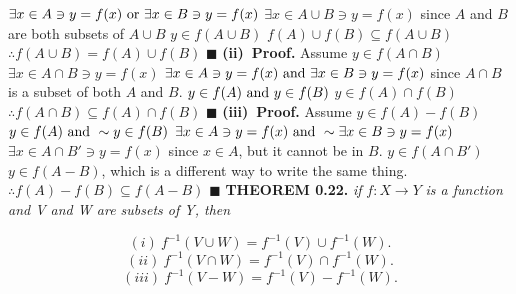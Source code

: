 \documentclass[12pt]{article}
\begin{document}
	\newline
	\(\exists x \in A \ni y = f(x)\textup{ or } \exists x \in B\ni y = f(x)\)
	\newline
	\(\exists x \in A \cup B\ni y = f(x)\) since \(A\) and \(B\) are both subsets of \(A \cup B\)
	\newline
	\(y \in f(A \cup B)\)
	\newline
	\(f(A) \cup f(B) \subseteq f(A \cup B)\)
	\newline
	\(\therefore f(A \cup B) = f(A) \cup f(B)\)
	\newline \(\blacksquare\) \newline \newline
	\textbf{(ii)\ Proof.}
	\newline
	Assume \(y \in f(A\cap B)\)
	\newline
	\(\exists x \in A\cap B\ni y = f(x)\)
	\newline
	\(\exists x \in A \ni y = f(x)\textup{ and } \exists x \in B\ni y = f(x)\) since \(A\cap B\) is a subset of both \(A\) and \(B\).
	\newline
	\(y \in f(A) \textup{ and } y \in f(B)\)
	\newline
	\(y \in f(A) \cap f(B)\)
	\newline
	\(\therefore f(A \cap B) \subseteq f(A) \cap f(B)\)
	\newline \(\blacksquare\) \newline \newline
	\textbf{(iii)\ Proof.}
	\newline
	Assume \(y \in f(A) - f(B)\)
	\newline
	\(y \in f(A) \textup{ and }\sim y \in f(B) \)
	\newline
	\(\exists x \in A \ni y = f(x)\textup{ and }\sim \exists x \in B\ni y = f(x)\)
	\newline
	\(\exists x \in A\cap B'\ni y = f(x)\) since \(x \in A\), but it cannot be in \(B\).
	\newline
	\(y \in f(A\cap B')\)
	\newline
	\(y \in f(A-B)\), which is a different way to write the same thing.
	\newline
	\(\therefore f(A)-f(B) \subseteq f(A-B)\)
	\newline \(\blacksquare\)
	\newpage
	\textbf{THEOREM 0.22. }\textit{if }\(f:X\rightarrow Y\) \textit{ is a function and V and W are subsets of Y, then}
	\begin{adjustwidth}{-3cm}{0cm}
		\begin{flushleft}
		\[(i)\ f^{-1}(V\cup W)=f^{-1}(V)\cup f^{-1}(W).\]
		\[(ii)\ f^{-1}(V\cap W)=f^{-1}(V)\cap f^{-1}(W).\]
		\[(iii)\ f^{-1}(V - W)=f^{-1}(V) - f^{-1}(W).\]
	\end{flushleft}
	\end{adjustwidth}
\end{document}
